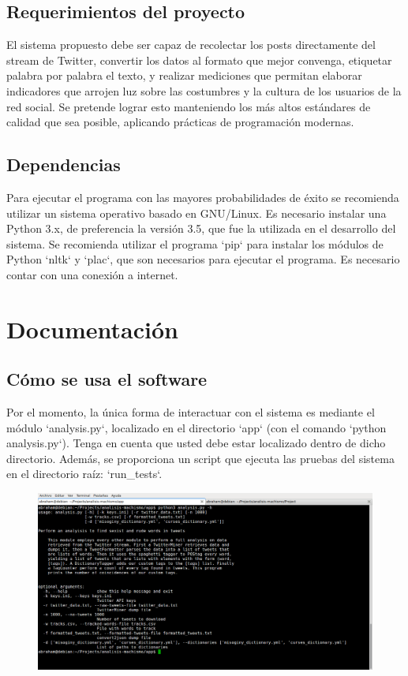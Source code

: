 \documentclass{article}
\begin{document}
\subsection{Requerimientos del proyecto}
El sistema propuesto debe ser capaz de recolectar los posts directamente del
stream de Twitter, convertir los datos al formato que mejor convenga, etiquetar
palabra por palabra el texto, y realizar mediciones que permitan elaborar
indicadores que arrojen luz sobre las costumbres y la cultura de los usuarios
de la red social. Se pretende lograr esto manteniendo los más altos estándares
de calidad que sea posible, aplicando prácticas de programación modernas.

\subsection{Dependencias}
Para ejecutar el programa con las mayores probabilidades de éxito se recomienda
utilizar un sistema operativo basado en GNU/Linux. Es necesario instalar una
Python 3.x, de preferencia la versión 3.5, que fue la utilizada en el
desarrollo del sistema. Se recomienda utilizar el programa `pip` para instalar
los módulos de Python `nltk` y `plac`, que son necesarios para ejecutar el
programa. Es necesario contar con una conexión a internet.

\section{Documentación}
\subsection{Cómo se usa el software}
Por el momento, la única forma de interactuar con el sistema es mediante el
módulo `analysis.py`, localizado en el directorio `app` (con el comando
`python analysis.py`). Tenga en cuenta que usted debe estar localizado dentro
de dicho directorio. Además, se proporciona un script que ejecuta las pruebas
del sistema en el directorio raíz: `run\_tests`.

\begin{figure}[H]
\includegraphics[scale=0.35]{help.png}
\end{figure}
\end{document}
